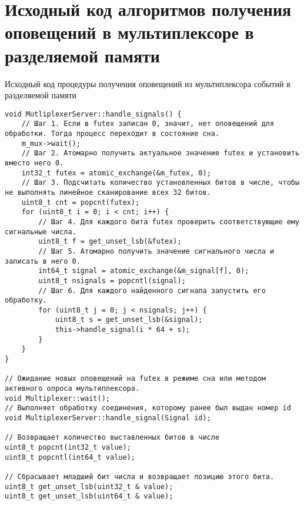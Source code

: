 \chapter{Исходный код алгоритмов получения оповещений в мультиплексоре в разделяемой памяти}\label{sec:app:1}

\begin{algorithm}[!h]
\caption{Исходный код процедуры получения оповещений из мультиплексора событий в разделяемой памяти}
\label{appendix91:ReceiverCode}
\begin{lstlisting}[frame=tlrb]
void MutliplexerServer::handle_signals() {
	// Шаг 1. Если в futex записан 0, значит, нет оповещений для обработки. Тогда процесс переходит в состояние сна.
	m_mux->wait();
	// Шаг 2. Атомарно получить актуальное значение futex и установить вместо него 0.
	int32_t futex = atomic_exchange(&m_futex, 0);
	// Шаг 3. Подсчитать количество установленных битов в числе, чтобы не выполнять линейное сканирование всех 32 битов.
	uint8_t cnt = popcnt(futex);
	for (uint8_t i = 0; i < cnt; i++) {
		// Шаг 4. Для каждого бита futex проверить соответствующие ему сигнальные числа.
		uint8_t f = get_unset_lsb(&futex);
		// Шаг 5. Атомарно получить значение сигнального числа и записать в него 0.
		int64_t signal = atomic_exchange(&m_signal[f], 0);
		uint8_t nsignals = popcntl(signal);
		// Шаг 6. Для каждого найденного сигнала запустить его обработку.
		for (uint8_t j = 0; j < nsignals; j++) {
			uint8_t s = get_unset_lsb(&signal);
			this->handle_signal(i * 64 + s);
		}
	}
}

// Ожидание новых оповещений на futex в режиме сна или методом активного опроса мультиплексора.
void Multiplexer::wait();
// Выполняет обработку соединения, которому ранее был выдан номер id
void MultiplexerServer::handle_signal(Signal id);

// Возвращает количество выставленных битов в числе
uint8_t popcnt(int32_t value);
uint8_t popcntl(int64_t value);

// Сбрасывает младший бит числа и возвращает позицию этого бита.
uint8_t get_unset_lsb(uint32_t & value);
uint8_t get_unset_lsb(uint64_t & value);
\end{lstlisting}
\end{algorithm}

